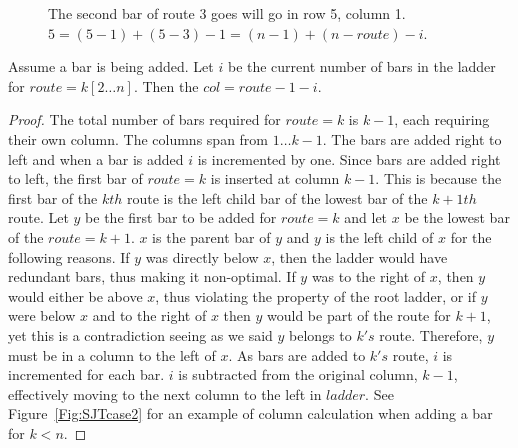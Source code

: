 \begin{figure}[!htp]
  \begin{center}
    

\end{center}
\caption{The second bar of route 3 goes will go in row 5, column 1. $5 = (5-1)+(5-3)-1 = (n-1)+(n-route)-i$.}
\label{Fig:SJTcase1}
\end{figure}
\pagebreak


\begin{lemma}
  Assume a bar is being added. Let $i$ be the current number of bars in the ladder for $route=k[2 \dots n]$.
  Then the $col=route-1-i$.
\end{lemma}
\begin{proof}
  The total number of bars required for $route=k$ is $k-1$, each requiring their own column. The columns 
  span from $1 \dots k-1$. The 
  bars are added right to left and when a bar is added $i$ is incremented by one. 
  Since bars are 
  added right to left, the first bar 
  of $route=k$ is inserted at column $k-1$. This is because the first bar of the $kth$ route is the left child bar of the 
  lowest bar of the $k+1th$ route. Let $y$ be the first bar to be added for $route=k$ and let $x$ be 
  the 
  lowest bar of the $route=k+1$. $x$ is the parent bar of $y$ and $y$ is the left child of 
  $x$ for the following reasons. If $y$ was directly below $x$, then the ladder would have redundant bars, thus making it 
  non-optimal. If $y$ was to the right of $x$, then $y$ would either be above $x$, thus violating the property of the root ladder, 
  or if $y$ were below $x$ and to the right of $x$ then $y$ would be part of the route for $k+1$, yet this is a contradiction 
  seeing as we said $y$ belongs to $k's$ route. Therefore, $y$ must be in a column to the left of $x$. As bars are added 
  to $k's$ route, $i$ is incremented for each bar. $i$ is subtracted from the original column, $k-1$, effectively moving 
  to the next column to the left in $ladder$. See Figure~\ref{Fig:SJTcase2} for an example of column calculation when adding a bar for $k<n$.
\end{proof}

